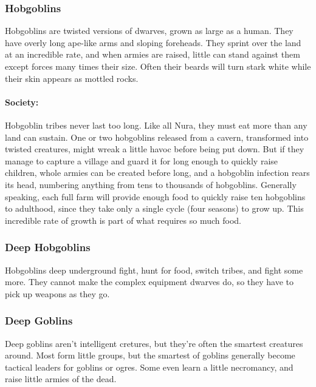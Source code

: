 \begin{multicols}{2}
\subsubsection{Hobgoblins}\label{hobgoblin}

Hobgoblins are twisted versions of dwarves, grown as large as a human.  They have overly long ape-like arms and sloping foreheads.  They sprint over the land at an incredible rate, and when armies are raised, little can stand against them except forces many times their size.  Often their beards will turn stark white while their skin appears as mottled rocks.

\paragraph{Society:} Hobgoblin tribes never last too long.  Like all Nura, they must eat more than any land can sustain.  One or two hobgoblins released from a cavern, transformed into twisted creatures, might wreak a little havoc before being put down.  But if they manage to capture a village and guard it for long enough to quickly raise children, whole armies can be created before long, and a hobgoblin infection rears its head, numbering anything from tens to thousands of hobgoblins.  Generally speaking, each full farm will provide enough food to quickly raise ten hobgoblins to adulthood, since they take only a single cycle (four seasons) to grow up.  This incredible rate of growth is part of what requires so much food.
  
\hobgoblin

\subsubsection{Deep Hobgoblins}\label{deep_hobgoblin}

Hobgoblins deep underground fight, hunt for food, switch tribes, and fight some more.  They cannot make the complex equipment dwarves do, so they have to pick up weapons as they go.

\deephobgoblin

\subsubsection{Deep Goblins}\label{deep_goblin}

Deep goblins aren't intelligent cretures, but they're often the smartest creatures around.  Most form little groups, but the smartest of goblins generally become tactical leaders for goblins or ogres.  Some even learn a little necromancy, and raise little armies of the dead.


\end{multicols}
